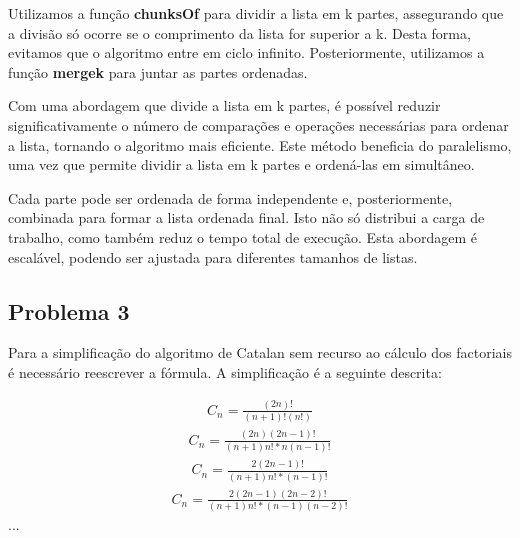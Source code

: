 \documentclass[11pt, a4paper, fleqn]{article}
\newcommand{\Varid}[1]{\mathit{#1}}
\renewcommand{\leq}{\leqslant}
\def\resethooks{%
  \global\let\SaveRestoreHook\empty
  \global\let\ColumnHook\empty}
\newcommand{\hsindent}[1]{\quad}%
\let\hspre\empty
\let\hspost\empty
\begin{document}
Utilizamos a função \textbf{chunksOf} para dividir a lista em k partes, assegurando que a divisão só ocorre se o comprimento da lista for superior a k. Desta forma, evitamos que o algoritmo entre em ciclo infinito. Posteriormente, utilizamos a função \textbf{mergek} para juntar as partes ordenadas.
\resethooks
Com uma abordagem que divide a lista em k partes, é possível reduzir significativamente o número de comparações e operações necessárias para ordenar a lista, tornando o algoritmo mais eficiente. Este método beneficia do paralelismo, uma vez que permite dividir a lista em k partes e ordená-las em simultâneo.

Cada parte pode ser ordenada de forma independente e, posteriormente, combinada para formar a lista ordenada final. Isto não só distribui a carga de trabalho, como também reduz o tempo total de execução. Esta abordagem é escalável, podendo ser ajustada para diferentes tamanhos de listas.

\subsection*{Problema 3}
Para a simplificação do algoritmo de Catalan sem recurso ao cálculo dos factoriais
é necessário reescrever a fórmula. A simplificação é a seguinte descrita:

\begin{eqnarray}
C_n = \frac{(2n)!}{(n+1)! (n!) }
\label{eq:cat}
\end{eqnarray}
\begin{eqnarray}
    C_n = \frac{(2n)(2n-1)!}{(n+1)n!*n(n-1)! }
    \label{eq:cat}
\end{eqnarray}
\begin{eqnarray}
    C_n = \frac{2(2n-1)!}{(n+1)n!*(n-1)! }
    \label{eq:cat}
\end{eqnarray}
\begin{eqnarray}
    C_n = \frac{2(2n-1)(2n-2)!}{(n+1)n!*(n-1)(n-2)! }
    \label{eq:cat}
\end{eqnarray}
\hspace{2cm} ...
\end{document}
